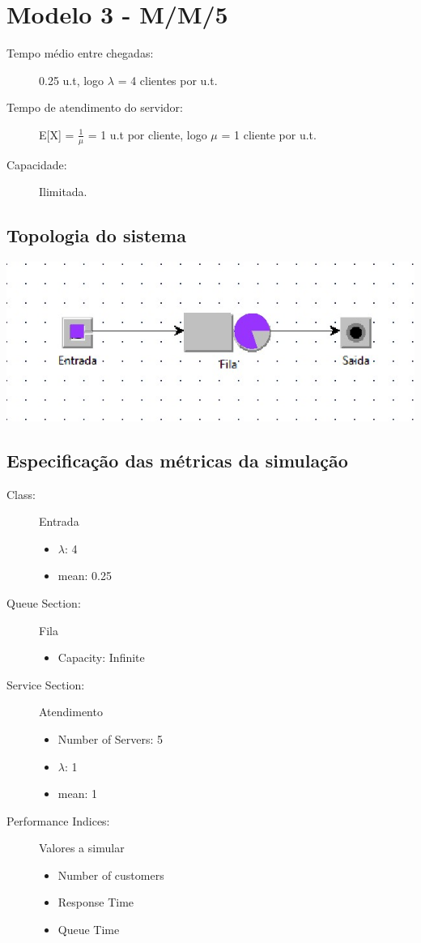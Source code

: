 \documentclass[12pt,a4paper]{article}
\begin{document}
\newpage
\section{Modelo 3 - M/M/5}
\begin{description}
	\item[Tempo médio entre chegadas:] 0.25 u.t, logo $\lambda$ = 4 clientes por u.t.
	\item[Tempo de atendimento do servidor:] E[X] = $\frac{1}{\mu}$ = 1 u.t por cliente, logo $\mu$ = 1 cliente por u.t.
	\item[Capacidade:] Ilimitada.
\end{description}

\subsection{Topologia do sistema}
\includegraphics[width=\linewidth]{topologias/m3.jpg}

\subsection{Especificação das métricas da simulação}
\begin{description}
	\item[Class:] Entrada 
	\begin{itemize}
		\item $\lambda$: 4
		\item mean: 0.25
	\end{itemize}
	\item[Queue Section:] Fila
	\begin{itemize}
		\item Capacity: Infinite
	\end{itemize}
	\item[Service Section:] Atendimento
	\begin{itemize}
		\item Number of Servers: 5
		\item $\lambda$: 1
		\item mean: 1
	\end{itemize}
	\item[Performance Indices:] Valores a simular 
	\begin{itemize}
		\item Number of customers
		\item Response Time
		\item Queue Time
	\end{itemize}
\end{description}
\end{document}
